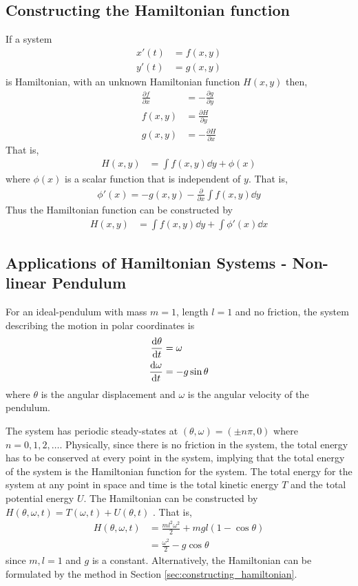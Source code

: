 \documentclass[12pt,1in]{article}
\begin{document}
\subsection{Constructing the Hamiltonian function \label{sec:constructing_hamiltonian}}
If a system 
\begin{align}
x'(t) &= f(x,y) \\
y'(t) &= g(x,y)
\end{align}
is Hamiltonian, with an unknown Hamiltonian function $H(x,y)$ then, \cite[pp. 499]{diff_eq}
\begin{align}
\frac{\partial f}{\partial x} &= -\frac{\partial g}{\partial y}  \\
f(x,y) &= \frac{\partial H}{\partial y} \\
g(x,y) &=  - \frac{\partial H}{\partial x}
\end{align}
That is,
\begin{align}
H(x,y) &= \int f(x,y) \dd{y} + \phi(x)
\end{align}
where $\phi(x)$ is a scalar function that is independent of $y$. That is,
\begin{align}
\phi'(x) = - g ( x , y ) - \frac { \partial } { \partial x } \int f ( x , y ) \dd{y}
\end{align}
Thus the Hamiltonian function can be constructed by 
\begin{align}
H(x,y) &= \int f(x,y) \dd{y} + \int \phi'(x) \dd{x}
\end{align}
\subsection{Applications of Hamiltonian Systems - Non-linear Pendulum}
For an ideal-pendulum with mass $m = 1$, length $l = 1$ and no friction, the system describing the motion in polar coordinates is 
\begin{align}
\derivative{\theta}{t} &= \omega \\
\derivative{\omega}{t} &= -g \sin\theta
\end{align}  
where $\theta$ is the angular displacement and $\omega$ is the angular velocity of the pendulum. 

The system has periodic steady-states at $(\theta, \omega ) = (\pm n\pi , 0)$ where $n = 0,1,2,\ldots$. Physically, since there is no friction in the system, the total energy has to be conserved at every point in the system, implying that the total energy of the system is the Hamiltonian function for the system. The total energy for the system at any point in space and time is the total kinetic energy $T$ and the total potential energy $U$. The Hamiltonian can be constructed by $H(\theta, \omega, t) = T(\omega, t) + U(\theta, t)$ \cite{engr_math}. That is,
\begin{align}
H(\theta,\omega, t) &= \frac{m l^2 \omega^2}{2} + mgl(1 - \cos\theta) \\
&= \frac{\omega^2}{2} - g\cos\theta \label{eq:hamiltonian_pendulum}
\end{align}
since $m,l = 1$ and $g$ is a constant. Alternatively, the Hamiltonian can be formulated by the method in Section \ref{sec:constructing_hamiltonian}. 
\end{document}
